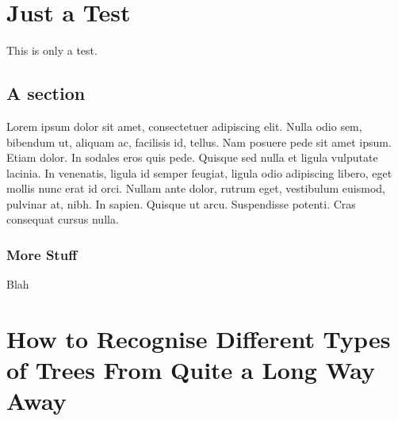 \documentclass[12pt,chapterheads]{ucsd}
\begin{document}
%







%   
%   
%
\chapter{Just a Test}
This is only a test.
\section{A section}
Lorem ipsum dolor sit amet, consectetuer adipiscing elit. Nulla odio
sem, bibendum ut, aliquam ac, facilisis id, tellus. Nam posuere pede
sit amet ipsum. Etiam dolor. In sodales eros quis pede.  Quisque sed
nulla et ligula vulputate lacinia. In venenatis, ligula id semper
feugiat, ligula odio adipiscing libero, eget mollis nunc erat id orci.
Nullam ante dolor, rutrum eget, vestibulum euismod, pulvinar at, nibh.
In sapien. Quisque ut arcu. Suspendisse potenti. Cras consequat cursus
nulla.
\subsection{More Stuff}
Blah

\chapter{How to Recognise Different Types of Trees From Quite a Long Way Away}
\end{document}

